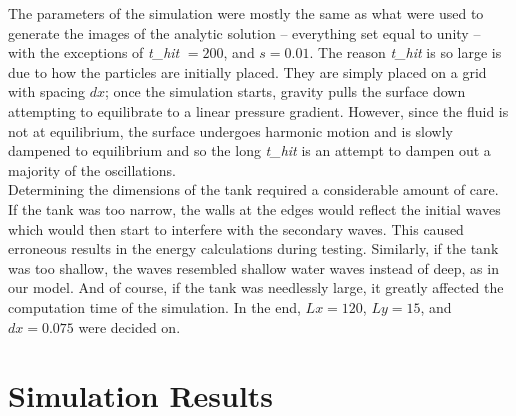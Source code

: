 The parameters of the simulation were mostly the same as what were used to generate the images of the analytic solution -- everything set equal to unity -- with the exceptions of \emph{t\_hit} $= 200$, and $s=0.01$. The reason \emph{t\_hit} is so large is due to how the particles are initially placed. They are simply placed on a grid with spacing $dx$; once the simulation starts, gravity pulls the surface down attempting to equilibrate to a linear pressure gradient. However, since the fluid is not at equilibrium, the surface undergoes harmonic motion and is slowly dampened to equilibrium and so the long \emph{t\_hit} is an attempt to dampen out a majority of the oscillations. \\

Determining the dimensions of the tank required a considerable amount of care. If the tank was too narrow, the walls at the edges would reflect the initial waves which would then start to interfere with the secondary waves. This caused erroneous results in the energy calculations during testing. Similarly, if the tank was too shallow, the waves resembled shallow water waves instead of deep, as in our model. And of course, if the tank was needlessly large, it greatly affected the computation time of the simulation. In the end, $Lx = 120$, $Ly = 15$, and $dx = 0.075$ were decided on.

\section{Simulation Results}

